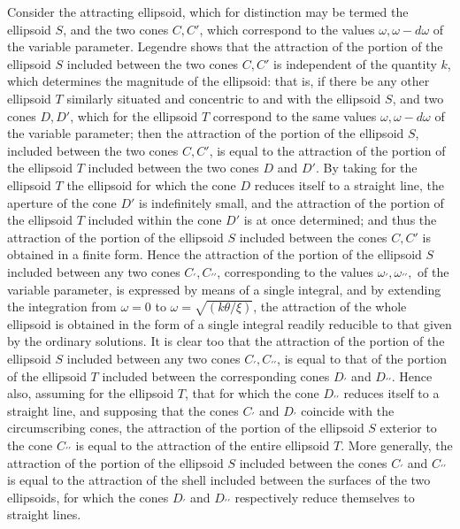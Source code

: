 \documentclass[11pt]{article}
\begin{document}
Consider the attracting ellipsoid, which for distinction may be termed the ellipsoid $S$, and the two cones $C, C'$, which correspond to the values $\omega, \omega - d\omega$ of the variable parameter. Legendre shows that the attraction of the portion of the ellipsoid $S$ included between the two cones $C, C'$ is independent of the quantity $k$, which determines the magnitude of the ellipsoid: that is, if there be any other ellipsoid $T$ similarly situated and concentric to and with the ellipsoid $S$, and two cones $D, D'$, which for the ellipsoid $T$ correspond to the same values $\omega, \omega - d\omega$ of the variable parameter; then the attraction of the portion of the ellipsoid $S$, included between the two cones $C, C'$, is equal to the attraction of the portion of the ellipsoid $T$ included between the two cones $D$ and $D'$. By taking for the ellipsoid $T$ the ellipsoid for which the cone $D$ reduces itself to a straight line, the aperture of the cone $D'$ is indefinitely small, and the attraction of the portion of the ellipsoid $T$ included within the cone $D'$ is at once determined; and thus the attraction of the portion of the ellipsoid $S$ included between the cones $C, C'$ is obtained in a finite form. Hence the attraction of the portion of the ellipsoid $S$ included between any two cones $C_{\prime}, C_{\prime\prime}$, corresponding to the values $\omega_{\prime}, \omega_{\prime\prime},$ of the variable parameter, is expressed by means of a single integral, and by extending the integration from $\omega = 0$ to $\omega = \sqrt{(k\theta/\xi)}$, the attraction of the whole ellipsoid is obtained in the form of a single integral readily reducible to that given by the ordinary solutions. It is clear too that the attraction of the portion of the ellipsoid $S$ included between any two cones $C_{\prime}, C_{\prime\prime}$, is equal to that of the portion of the ellipsoid $T$ included between the corresponding cones $D_{\prime}$ and $D_{\prime\prime}$. Hence also, assuming for the ellipsoid $T$, that for which the cone $D_{\prime\prime}$ reduces itself to a straight line, and supposing that the cones $C_{\prime}$ and $D_{\prime}$ coincide with the circumscribing cones, the attraction of the portion of the ellipsoid $S$ exterior to the cone $C_{\prime\prime}$ is equal to the attraction of the entire ellipsoid $T$. More generally, the attraction of the portion of the ellipsoid $S$ included between the cones $C_{\prime}$ and $C_{\prime\prime}$ is equal to the attraction of the shell included between the surfaces of the two ellipsoids, for which the cones $D_{\prime}$ and $D_{\prime\prime}$ respectively reduce themselves to straight lines.
\end{document}
